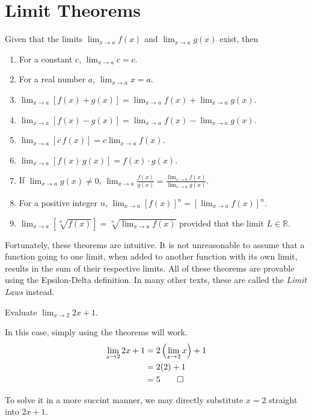 \section{Limit Theorems}
\begin{thm}\label{thm:lims}
	Given that the limits $\lim_{x\to a} f(x)$ and $\lim_{x\to a} g(x)$ exist, then\vspace{0.5em}
	\begin{enumerate}[itemsep=0.5em]
		\item For a constant $c$, $\displaystyle\lim_{x\to a}c=c$.
		\item For a real number $a$, $\displaystyle\lim_{x\to a}x=a$.
		\item $\displaystyle\lim_{x\to a}[f(x) + g(x)]=\lim_{x\to a} f(x) + \lim_{x\to a} g(x)$.
		\item $\displaystyle\lim_{x\to a}[f(x) - g(x)]=\lim_{x\to a} f(x) - \lim_{x\to a} g(x)$.
		\item $\displaystyle\lim_{x\to a}[c\,f(x)]=c \lim_{x\to a} f(x)$.
		\item $\displaystyle\lim_{x\to a}[f(x)\,g(x)]=f(x)\cdot g(x)$.
		\item If $\lim_{x\to a} g(x)\neq 0$, $\displaystyle\lim_{x\to a}\frac{f(x)}{g(x)}=\frac{\lim_{x\to a} f(x)}{\lim_{x\to a} g(x)}$.
		\item For a positive integer $n$, $\displaystyle\lim_{x\to a}[f(x)]^n= \left[\lim_{x\to a} f(x)\right]^n$.
		\item $\displaystyle\lim_{x\to a}\left[\sqrt[n]{f(x)}\right]=\sqrt[n]{\lim_{x\to a} f(x)}$ provided that the limit $L \in \mathbb{R}$.
	\end{enumerate}
\end{thm}
Fortunately, these theorems are intuitive. It is not unreasonable to assume that a function going to one limit, when added to another function with its own limit, results in the sum of their respective limits.
All of these theorems are provable using the Epsilon-Delta definition. In many other texts, these are called the \textit{Limit Laws} instead. 
\begin{exmp}\label{eqn:firstexmp}
	Evaluate $\displaystyle\lim_{x\to 2} 2x + 1$.
	\begin{soln}
		In this case, simply using the theorems will work.
		\begin{align*}
			\lim_{x\to 2} 2x + 1 &= 2\left(\lim_{x\to 2} x\right) + 1\\
			&= 2(2) + 1 \\
			&= 5\qedhere
		\end{align*}
	\end{soln}
\end{exmp}
To solve it in a more succint manner, we may directly substitute $x=2$ straight into $2x+1$.

